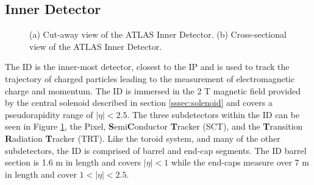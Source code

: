 	\subsection{Inner Detector}\label{ssec:ID}
		\begin{figure}[!h]
		\centering
		\caption{\label{fig:ATLAS-ID} (a) Cut-away view of the ATLAS Inner Detector. (b) Cross-sectional view of the ATLAS Inner Detector.}
		\end{figure}

		The ID is the inner-most detector, closest to the IP and is used to track the trajectory of charged particles leading to the measurement of electromagnetic charge and momentum. The ID is immersed in the 2 T magnetic field provided by the central solenoid described in section \ref{sssec:solenoid} and covers a pseudorapidity range of $|\eta|<2.5$. The three subdetectors within the ID can be seen in Figure \ref{fig:ATLAS-ID}, the Pixel, \textbf{S}emi\textbf{C}onductor \textbf{T}racker (SCT), and the \textbf{T}ransition \textbf{R}adiation \textbf{T}racker (TRT). Like the toroid system, and many of the other subdetectors, the ID is comprised of barrel and end-cap segments. The ID barrel section is 1.6 m in length and covers $|\eta|<1$ while the end-caps measure over 7 m in length and cover $1 < |\eta| < 2.5$. 

